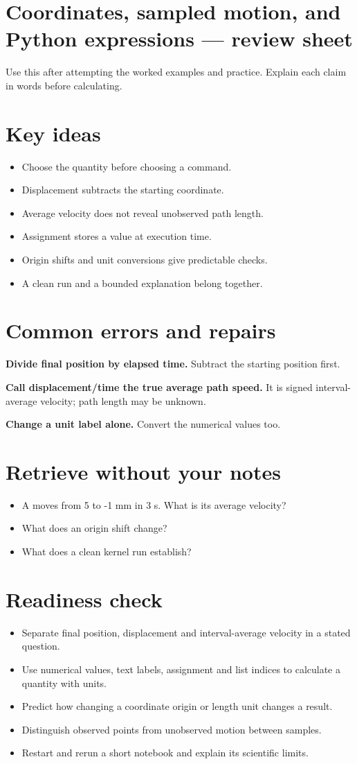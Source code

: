 \documentclass[11pt,letterpaper]{article}
\theoremstyle{definition}\newtheorem{definition}{Definition}\newtheorem{example}{Example}
\numberwithin{equation}{section}
\begin{document}
\section*{Coordinates, sampled motion, and Python expressions --- review sheet}
Use this after attempting the worked examples and practice. Explain each claim in words before calculating.

\section*{Key ideas}
\begin{itemize}
\item Choose the quantity before choosing a command.
\item Displacement subtracts the starting coordinate.
\item Average velocity does not reveal unobserved path length.
\item Assignment stores a value at execution time.
\item Origin shifts and unit conversions give predictable checks.
\item A clean run and a bounded explanation belong together.
\end{itemize}
\section*{Common errors and repairs}
\textbf{Divide final position by elapsed time.} Subtract the starting position first.

\textbf{Call displacement/time the true average path speed.} It is signed interval-average velocity; path length may be unknown.

\textbf{Change a unit label alone.} Convert the numerical values too.

\section*{Retrieve without your notes}
\begin{itemize}
\item A moves from 5 to -1 mm in 3 s. What is its average velocity?
\item What does an origin shift change?
\item What does a clean kernel run establish?
\end{itemize}
\section*{Readiness check}
\begin{itemize}
\item Separate final position, displacement and interval-average velocity in a stated question.
\item Use numerical values, text labels, assignment and list indices to calculate a quantity with units.
\item Predict how changing a coordinate origin or length unit changes a result.
\item Distinguish observed points from unobserved motion between samples.
\item Restart and rerun a short notebook and explain its scientific limits.
\end{itemize}
\end{document}
